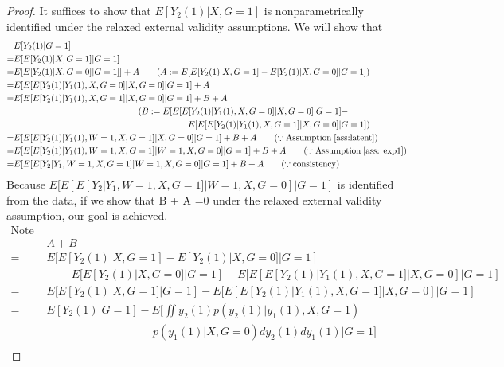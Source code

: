 \documentclass{article}
\begin{document}
\begin{proof}
    It suffices to show that $E[ Y_2(1) | X, G= 1]$ is nonparametrically identified under the relaxed external validity assumptions. We will show that
    \begin{align*}
    &E[ Y_2(1) | G=1 ]\\
    =& E [E[ Y_2(1) | X, G=1 ] | G=1] \\
    =& E[ E[ Y_2(1) | X, G= 0 ] | G=1] ] + A
    \qquad ( A: = E[ E[ Y_2(1) | X, G =1 ] - E[ Y_2(1) | X, G =0 ] | G=1]) \\
    =& E[ E[ E[ Y_2(1) |  Y_1(1), X, G= 0 ] | X, G =0] | G=1 ]   + A \\
    =& E[ E[ E[ Y_2(1) | Y_1(1), X, G=1 ] | X, G =0] | G=1] + B + A \\
    &\hspace{5cm}( B: =E[ E[ E[ Y_2(1)| Y_1(1), X, G=0 ] | X, G = 0] | G = 1] -\\
    &\hspace{7cm} E[ E[ E[ Y_2(1)| Y_1(1), X, G=1 ] | X, G = 0] | G = 1] ) \\
    =& E[ E[ E[ Y_2(1) | Y_1(1), W=1, X, G=1] | X, G=0] | G=1] + B + A \qquad( \because  \text{Assumption}\; \ref{ass:latent} ) \\
    =& E[ E[ E[ Y_2(1) | Y_1(1), W=1, X, G=1] | W=1,X, G=0] | G=1] + B + A\qquad( \because \text{Assumption}\; \ref{ass: exp1}) \\
    =& E[ E[ E[ Y_2 | Y_1 , W=1, X, G=1] | W=1, X, G=0] | G=1] + B + A\qquad (\because \text{consistency} )
    \end{align*}
    Because $E[ E[ E[ Y_2 | Y_1 , W=1, X, G=1] | W=1, X, G=0] | G=1]$ is identified from the data, if we show that B + A =0 under the relaxed external validity assumption, our goal is achieved.
    \begin{align*}
    \text{Note that } \\
    &A + B\\
    =& E[ E[ Y_2(1) | X, G=1] - E[ Y_2(1) | X, G= 0 ] | G=1]  \\
    & \quad-  E[ E[ Y_2(1)| X, G = 0] | G = 1] - E[ E[ E[ Y_2(1)| Y_1(1), X, G=1 ] | X, G = 0] | G = 1] \\
    =& E[ E[ Y_2(1) | X, G=1] | G=1] - E[ E[ E[ Y_2(1)| Y_1(1), X, G=1 ] | X, G = 0] | G = 1] \\
    =& E[ Y_2(1) | G=1] - E\biggl[ \iint y_2(1)  p(y_2(1) | y_1(1), X, G=1)\\
    &\hspace{4cm} p( y_1(1) | X, G=0) dy_2(1) dy_1(1) \bigg| G=1 \biggr] \\

\end{align*}
\end{proof}
\end{document}
